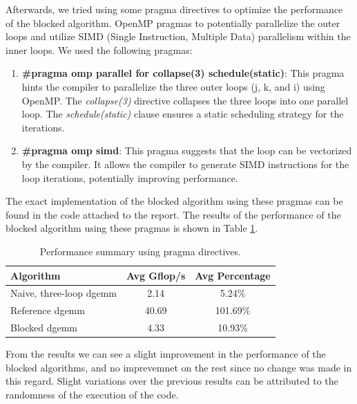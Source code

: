 \documentclass[unicode,11pt,a4paper,oneside,numbers=endperiod,openany]{scrartcl}
\begin{document}
Afterwards, we tried using some pragma directives to optimize the performance of the blocked algorithm.
OpenMP pragmas to potentially parallelize the outer loops and utilize SIMD (Single Instruction, Multiple Data) 
parallelism within the inner loops.
We used the following pragmas:
\begin{enumerate}
    \item \textbf{\#pragma omp parallel for collapse(3) schedule(static)}: This pragma hints the compiler to parallelize 
    the three outer loops (j, k, and i) using OpenMP. The \textit{collapse(3)} directive collapses the three loops into 
    one parallel loop. The \textit{schedule(static)} clause ensures a static scheduling strategy for the iterations.
    
    \item \textbf{\#pragma omp simd}: This pragma suggests that the loop can be vectorized by the compiler. 
    It allows the compiler to generate SIMD instructions for the loop iterations, potentially improving performance.
\end{enumerate}
The exact implementation of the blocked algorithm using these pragmas can be found in the code attached to the report.
The results of the performance of the blocked algorithm using these pragmas is shown in Table \ref{tab:performance_summary_pragmas}.
\begin{table}[htbp]
    \centering
    \caption{Performance summary using pragma directives.}
    \begin{tabular}{||lcc||}
        \hline
        Algorithm & Avg Gflop/s & Avg Percentage \\
        \hline
        \hline
        Naive, three-loop dgemm & 2.14 & 5.24\% \\
        Reference dgemm & 40.69 & 101.69\% \\
        Blocked dgemm & 4.33 & 10.93\% \\
        \hline
    \end{tabular}\label{tab:performance_summary_pragmas}
\end{table}
From the results we can see a slight improvement in the performance of the blocked algorithms, and no imprevemnet
on the rest since no change was made in this regard. Slight variations over the previous results can be attributed
to the randomness of the execution of the code.
\end{document}
